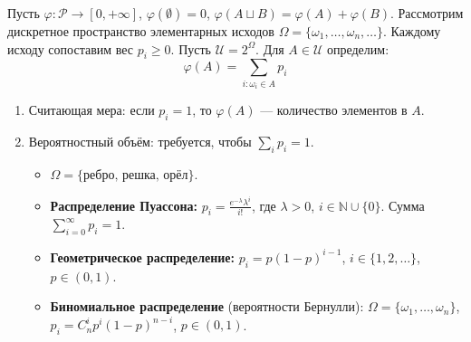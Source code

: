 \documentclass[12pt,a4paper]{article}
\begin{document}
\setcounter{section}{3} %

\begin{Example}
Пусть $\varphi: \mathcal{P} \to [0, +\infty]$, $\varphi(\emptyset) = 0$, $\varphi(A \sqcup B) = \varphi(A) + \varphi(B)$.
Рассмотрим дискретное пространство элементарных исходов $\Omega = \{\omega_1, \dots, \omega_n, \dots\}$. Каждому исходу сопоставим вес $p_i \ge 0$. Пусть $\mathcal{U} = 2^\Omega$. Для $A \in \mathcal{U}$ определим:
$$ \varphi(A) = \sum\limits_{i: \omega_i \in A} p_i $$
\begin{enumerate}
    \item Считающая мера: если $p_i = 1$, то $\varphi(A)$ — количество элементов в $A$.
    \item Вероятностный объём: требуется, чтобы $\sum\limits_{i} p_i = 1$.
    \begin{itemize}
        \item $\Omega = \{\text{ребро, решка, орёл}\}$.
        \item \textbf{Распределение Пуассона:} $p_i = \frac{e^{-\lambda}\lambda^i}{i!}$, где $\lambda > 0$, $i \in \mathbb{N} \cup \{0\}$. Сумма $\sum\limits_{i=0}^{\infty} p_i = 1$.
        \item \textbf{Геометрическое распределение:} $p_i = p(1-p)^{i-1}$, $i \in \{1, 2, \dots\}$, $p \in (0, 1)$.
        \item \textbf{Биномиальное распределение} (вероятности Бернулли): $\Omega = \{\omega_1, \dots, \omega_n\}$, $p_i = C_n^i p^i (1-p)^{n-i}$, $p \in (0, 1)$.
    \end{itemize}
\end{enumerate}
\end{Example}
\end{document}
